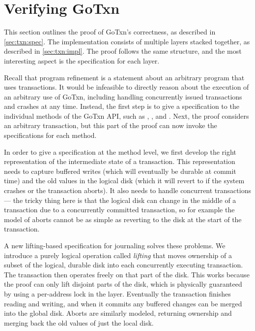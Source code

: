 \section{Verifying GoTxn}
\label{sec:txn:proof}

This section outlines the proof of GoTxn's correctness, as described in
\cref{sec:txn:spec}. The implementation consists of multiple layers stacked
together, as described in \cref{sec:txn:impl}. The proof follows the same
structure, and the most interesting aspect is the specification for each layer.

Recall that program refinement is a statement about an arbitrary program that
uses transactions. It would be infeasible to directly reason about the execution of an
arbitrary use of GoTxn, including handling concurrently issued transactions and
crashes at any time. Instead, the first step is to give a specification to the
individual methods of the GoTxn API, such as , , and
. Next, the proof considers an arbitrary transaction, but this part
of the proof can now invoke the specifications for each method.

In order to give a specification at the method level, we first
develop the right representation of the intermediate state of a transaction.
This representation needs to capture buffered writes (which will eventually be
durable at commit time) and the old values in the logical disk (which it will
revert to if the system crashes or the transaction aborts). It also needs to
handle concurrent transactions --- the tricky thing here is that the logical
disk can change in the middle of a transaction due to a concurrently committed
transaction, so for example the model of aborts cannot be as simple as reverting
to the disk at the start of the transaction.

A new lifting-based specification for journaling solves these problems. We
introduce a purely logical operation called \emph{lifting} that moves ownership
of a subset of the logical, durable disk into each concurrently executing
transaction. The transaction then operates freely on that part of the disk. This
works because the proof can only lift disjoint parts of the disk, which is
physically guaranteed by using a per-address lock in the  layer.
Eventually the transaction finishes reading and writing, and when it commits any
buffered changes can be merged into the global disk. Aborts are similarly
modeled, returning ownership and merging back the old values of just the local
disk.

